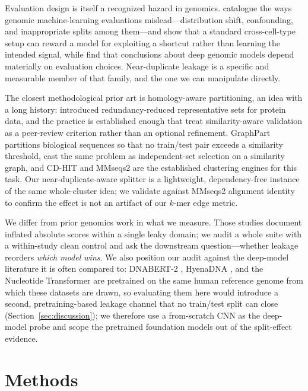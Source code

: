 \documentclass[webpdf,modern,large,namedate]{oup-authoring-template}%
\begin{document}
Evaluation design is itself a recognized hazard in genomics. \citet{whalen2022pitfalls} catalogue the ways genomic machine-learning evaluations mislead---distribution shift, confounding, and inappropriate splits among them---and \citet{schreiber2020pitfall} show that a standard cross-cell-type setup can reward a model for exploiting a shortcut rather than learning the intended signal, while \citet{toneyan2022evaluating} find that conclusions about deep genomic models depend materially on evaluation choices. Near-duplicate leakage is a specific and measurable member of that family, and the one we can manipulate directly.

The closest methodological prior art is homology-aware partitioning, an idea with a long history: \citet{hobohm1992} introduced redundancy-reduced representative sets for protein data, and the practice is established enough that \citet{walsh2016correct} treat similarity-aware validation as a peer-review criterion rather than an optional refinement. GraphPart \citep{teufel2023graphpart} partitions biological sequences so that no train/test pair exceeds a similarity threshold, \citet{petti2022benchmark} cast the same problem as independent-set selection on a similarity graph, and CD-HIT \citep{li2006cdhit} and MMseqs2 \citep{steinegger2017mmseqs2} are the established clustering engines for this task. Our near-duplicate-aware splitter is a lightweight, dependency-free instance of the same whole-cluster idea; we validate against MMseqs2 alignment identity to confirm the effect is not an artifact of our $k$-mer edge metric.

We differ from prior genomics work in what we measure. Those studies document inflated absolute scores within a single leaky domain; we audit a whole suite with a within-study clean control and ask the downstream question---whether leakage reorders \emph{which model wins}. We also position our audit against the deep-model literature it is often compared to: DNABERT-2 \citep{zhou2023dnabert2}, HyenaDNA \citep{nguyen2023hyenadna}, and the Nucleotide Transformer \citep{dallatorre2024nucleotide} are pretrained on the same human reference genome from which these datasets are drawn, so evaluating them here would introduce a second, pretraining-based leakage channel that no train/test split can close (Section~\ref{sec:discussion}); we therefore use a from-scratch CNN as the deep-model probe and scope the pretrained foundation models out of the split-effect evidence.

\section{Methods}
\end{document}
